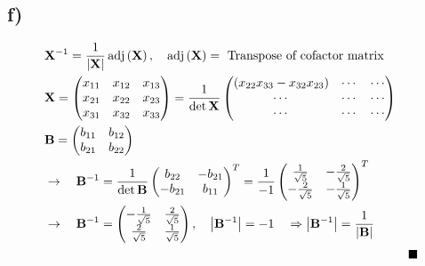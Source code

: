 \subsection*{f) }
\begin{align*}
	&\mathbf{X}^{-1}=\frac{1}{\left|\mathbf{X}\right|}\operatorname{adj}\left(\mathbf{X}\right),\quad\operatorname{adj}\left(\mathbf{X}\right)=\text{ Transpose of cofactor matrix}& \\
	&\mathbf{X}=
	\begin{pmatrix}
	x_{11} & x_{12} & x_{13} \\
	x_{21} & x_{22} & x_{23} \\
	x_{31} & x_{32} & x_{33}
	\end{pmatrix}=\frac{1}{\det\mathbf{X}}
	\begin{pmatrix}
		\left(x_{22}x_{33}-x_{32}x_{23}\right) & \cdots & \cdots \\
		\cdots & \cdots & \cdots \\
		\cdots & \cdots & \cdots
	\end{pmatrix}& \\
	&\mathbf{B}=
	\begin{pmatrix}
	b_{11} & b_{12} \\
	b_{21} & b_{22}
	\end{pmatrix}& \\
	&\rightarrow\quad\mathbf{B}^{-1}=\frac{1}{\det\mathbf{B}}
	\begin{pmatrix}
	b_{22} & -b_{21} \\
	-b_{21} & b_{11}
	\end{pmatrix}^{T}=\frac{1}{-1}
	\begin{pmatrix}
	\frac{1}{\sqrt{5}} & -\frac{2}{\sqrt{5}} \\
	-\frac{2}{\sqrt{5}} & -\frac{1}{\sqrt{5}}
	\end{pmatrix}^{T}& \\
	&\rightarrow\quad\mathbf{B}^{-1}=
	\begin{pmatrix}
	-\frac{1}{\sqrt{5}} & \frac{2}{\sqrt{5}} \\
	\frac{2}{\sqrt{5}} & \frac{1}{\sqrt{5}}
	\end{pmatrix},\quad\left|\mathbf{B}^{-1}\right|=-1\quad\Rightarrow\left|\mathbf{B}^{-1}\right|=\frac{1}{\left|\mathbf{B}\right|}& \\
	&&\blacksquare
\end{align*}

